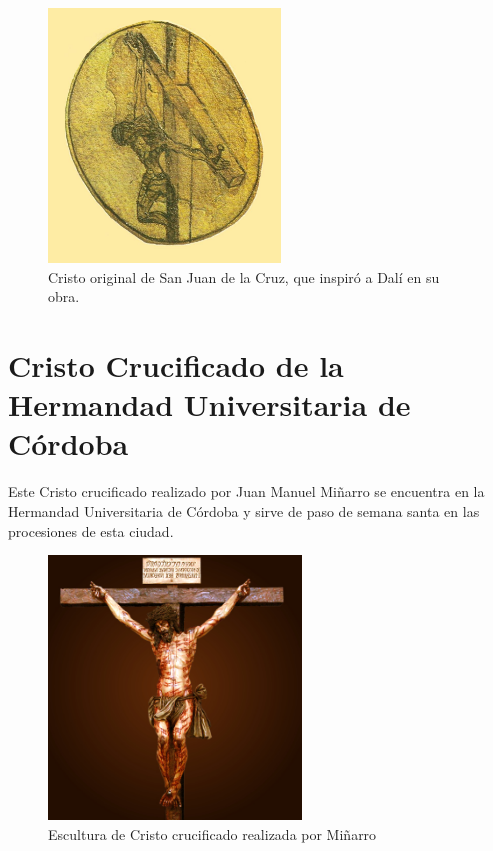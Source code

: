 \begin{figure}[H]
    \centering
    \includegraphics[width=0.55\textwidth]{sanju.jpg}
    \caption{Cristo original de San Juan de la Cruz, que inspiró a Dalí en su obra.} %
\end{figure}

\section{Cristo Crucificado de la Hermandad Universitaria de Córdoba} \label{app:crucificadominarro}

Este Cristo crucificado realizado por Juan Manuel Miñarro se encuentra en la Hermandad Universitaria de Córdoba y sirve de paso de semana santa en las procesiones de esta ciudad.

\begin{figure}[H]
    \centering
    \includegraphics[width=0.6\textwidth]{crucificadominarro.jpg}
    \caption{Escultura de Cristo crucificado realizada por Miñarro} %
\end{figure}

